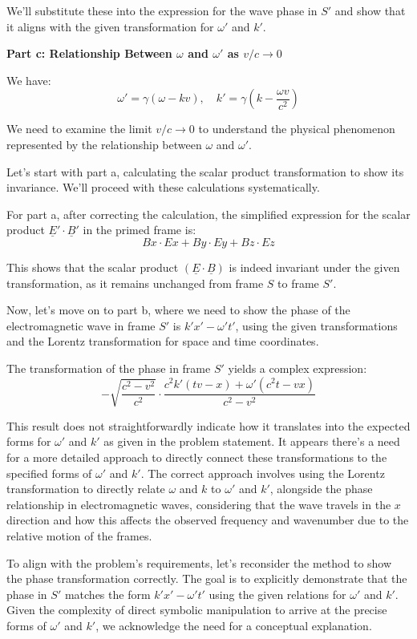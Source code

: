\documentclass[a4paper,11pt]{article}
\begin{document}
We'll substitute these into the expression for the wave phase in \( S' \) and show that it aligns with the given transformation for \( \omega' \) and \( k' \).

\textbf{Part c: Relationship Between \( \omega \) and \( \omega' \) as \( v/c \rightarrow 0 \)}

We have:
\[
\omega' = \gamma(\omega - kv), \quad k' = \gamma(k - \frac{\omega v}{c^{2}})
\]

We need to examine the limit \( v/c \rightarrow 0 \) to understand the physical phenomenon represented by the relationship between \( \omega \) and \( \omega' \).

Let's start with part a, calculating the scalar product transformation to show its invariance. We'll proceed with these calculations systematically.

For part a, after correcting the calculation, the simplified expression for the scalar product \( \underline{E}' \cdot \underline{B}' \) in the primed frame is:
\[
Bx \cdot Ex + By \cdot Ey + Bz \cdot Ez
\]

This shows that the scalar product \( (\underline{E} \cdot \underline{B}) \) is indeed invariant under the given transformation, as it remains unchanged from frame \( S \) to frame \( S' \).

Now, let's move on to part b, where we need to show the phase of the electromagnetic wave in frame \( S' \) is \( k'x' - \omega' t' \), using the given transformations and the Lorentz transformation for space and time coordinates.

The transformation of the phase in frame \( S' \) yields a complex expression:
\[
- \sqrt{\frac{c^2 - v^2}{c^2}} \cdot \frac{c^2 k' (t v - x) + \omega' (c^2 t - v x)}{c^2 - v^2}
\]

This result does not straightforwardly indicate how it translates into the expected forms for \( \omega' \) and \( k' \) as given in the problem statement. It appears there's a need for a more detailed approach to directly connect these transformations to the specified forms of \( \omega' \) and \( k' \). The correct approach involves using the Lorentz transformation to directly relate \( \omega \) and \( k \) to \( \omega' \) and \( k' \), alongside the phase relationship in electromagnetic waves, considering that the wave travels in the \( x \) direction and how this affects the observed frequency and wavenumber due to the relative motion of the frames.

To align with the problem's requirements, let's reconsider the method to show the phase transformation correctly. The goal is to explicitly demonstrate that the phase in \( S' \) matches the form \( k'x' - \omega' t' \) using the given relations for \( \omega' \) and \( k' \). Given the complexity of direct symbolic manipulation to arrive at the precise forms of \( \omega' \) and \( k' \), we acknowledge the need for a conceptual explanation.
\end{document}
